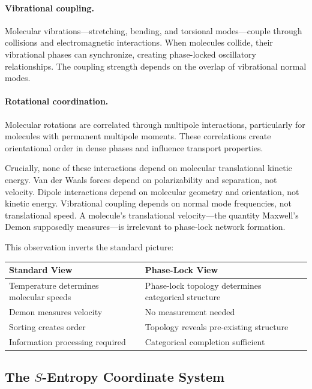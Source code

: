 \paragraph{Vibrational coupling.} Molecular vibrations---stretching, bending, and torsional modes---couple through collisions and electromagnetic interactions. When molecules collide, their vibrational phases can synchronize, creating phase-locked oscillatory relationships. The coupling strength depends on the overlap of vibrational normal modes.

\paragraph{Rotational coordination.} Molecular rotations are correlated through multipole interactions, particularly for molecules with permanent multipole moments. These correlations create orientational order in dense phases and influence transport properties.

Crucially, none of these interactions depend on molecular translational kinetic energy. Van der Waals forces depend on polarizability and separation, not velocity. Dipole interactions depend on molecular geometry and orientation, not kinetic energy. Vibrational coupling depends on normal mode frequencies, not translational speed. A molecule's translational velocity---the quantity Maxwell's Demon supposedly measures---is irrelevant to phase-lock network formation.

This observation inverts the standard picture:

\begin{center}
\begin{tabular}{p{3.5cm}|p{3.5cm}}
\textbf{Standard View} & \textbf{Phase-Lock View} \\
\hline
Temperature determines molecular speeds & Phase-lock topology determines categorical structure \\
Demon measures velocity & No measurement needed \\
Sorting creates order & Topology reveals pre-existing structure \\
Information processing required & Categorical completion sufficient
\end{tabular}
\end{center}

\subsection{The $S$-Entropy Coordinate System}

